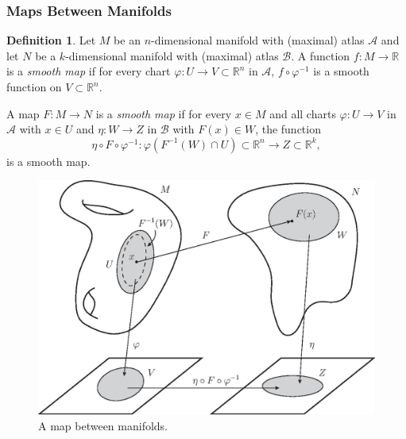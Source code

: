 \documentclass[12pt,a4paper]{article}
\numberwithin{equation}{section}
\theoremstyle{definition}
\newtheorem{definition}{Definition}[section]
\theoremstyle{remark}
\begin{document}
\subsubsection{Maps Between Manifolds}
\begin{definition}
Let $M$ be an $n$-dimensional manifold with (maximal) atlas $\mathcal{A}$ and let $N$ be a $k$-dimensional manifold with (maximal) atlas $\mathcal{B}$. A function $f:M\to\mathbb{R}$ is a \textit{smooth map} if for every chart $\varphi:U\to V\subset\mathbb{R}^n$ in $\mathcal{A}$, $f\circ\varphi^{-1}$ is a smooth function on $V\subset\mathbb{R}^n$.

A map $F:M\to N$ is a \textit{smooth map} if for every $x\in M$ and all charts $\varphi:U\to V$ in $\mathcal{A}$ with $x\in U$ and $\eta:W\to Z$ in $\mathcal{B}$ with $F(x)\in W$, the function
\[
\eta\circ F\circ\varphi^{-1}:\varphi(F^{-1}(W)\cap U)\subset\mathbb{R}^n\to Z\subset\mathbb{R}^k,
\]
is a smooth map.
\end{definition}   

\begin{figure}[h!]
\centering
\includegraphics[scale=0.7]{fig/mani-map-1b}
\caption{A map between manifolds.}
\label{fig:mani-map-1}
\end{figure}
\end{document}
